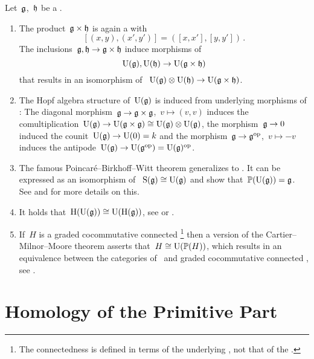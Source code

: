 \documentclass[a4paper,10pt,headings=standardclasses]{scrartcl}
\begin{document}
\begin{remark}
  Let~$\mathfrak{g}$,~$\mathfrak{h}$ be a {\dgls}.
  \begin{enumerate}
    \item
      The product~$\mathfrak{g} \times \mathfrak{h}$ is again a {\dgl} with
      \[
        [(x,y), (x',y')]
        =
        ( [x,x'], [y,y'] )  \,.
      \]
      The inclusions~$\mathfrak{g}, \mathfrak{h} \to \mathfrak{g} \times \mathfrak{h}$ induce morphisms of {\dghs}
      \[
        \operatorname{U}(\mathfrak{g}), \operatorname{U}(\mathfrak{h})
        \to
        \operatorname{U}(\mathfrak{g} \times \mathfrak{h})
      \]
      that results in an isomorphism of {\dghs}~$\operatorname{U}(\mathfrak{g}) \otimes \operatorname{U}(\mathfrak{h}) \to \operatorname{U}(\mathfrak{g} \times \mathfrak{h})$.
    \item
      The Hopf algebra structure of~$\operatorname{U}(\mathfrak{g})$ is induced from underlying morphisms of {\dgls}:
      The diagonal morphism~$\mathfrak{g} \to \mathfrak{g} \times \mathfrak{g}$,~$v \mapsto (v,v)$ induces the comultiplication~$\operatorname{U}(\mathfrak{g}) \to \operatorname{U}(\mathfrak{g} \times \mathfrak{g}) \cong \operatorname{U}(\mathfrak{g}) \otimes \operatorname{U}(\mathfrak{g})$, the morphism~$\mathfrak{g} \to 0$ induced the counit~$\operatorname{U}(\mathfrak{g}) \to \operatorname{U}(0) = k$ and the morphism~$\mathfrak{g} \to \mathfrak{g}^{\mathrm{op}}$,~$v \mapsto -v$ induces the antipode~$\operatorname{U}(\mathfrak{g}) \to \operatorname{U}(\mathfrak{g}^{\mathrm{op}}) = \operatorname{U}(\mathfrak{g})^{\mathrm{op}}$.
    \item
      The famous Poincaré–Birkhoff–Witt theorem generalizes to {\dgls}.
      It can be expressed as an isomorphism of {\dgc}~$\operatorname{S}(\mathfrak{g}) \cong \operatorname{U}(\mathfrak{g})$ and show that~$\mathbb{P}(\operatorname{U}(\mathfrak{g})) = \mathfrak{g}$.
      See \cite[B,Theorem~2.3]{quillen} and \cite[\S21 (a)]{rational_homotopy_book} for more details on this.
    \item
      It holds that~$\operatorname{H}(\operatorname{U}(\mathfrak{g})) \cong \operatorname{U}(\operatorname{H}(\mathfrak{g}))$, see \cite[B,Proposition~2.1]{quillen} or \cite[Theorem 21.7]{rational_homotopy_book}.
    \item
      If~$H$ is a graded cocommutative connected%
      \footnote{The connectedness is defined in terms of the underlying {\dgc}, not that of the {\dga}.}
      {\dgh} then a version of the Cartier--Milnor--Moore theorem asserts that~$H \cong \operatorname{U}(\mathbb{P}(H))$, which results in an equivalence between the categories of~{\dgls} and graded cocommutative connected {\dghs}, see \cite[B,Theorem~4.5]{quillen}.
  \end{enumerate}
\end{remark}





\section{Homology of the Primitive Part}
\end{document}
